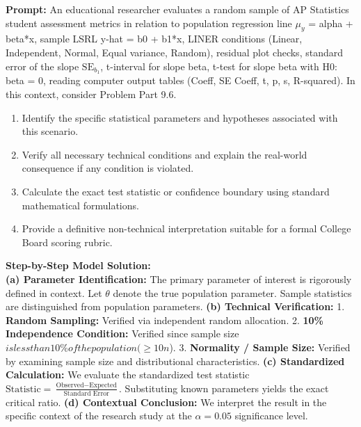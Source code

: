 \begin{workbookbox}
\textbf{Prompt:} An educational researcher evaluates a random sample of AP Statistics student assessment metrics in relation to population regression line $\mu_y$ = alpha + beta*x, sample LSRL y-hat = b0 + b1*x, LINER conditions (Linear, Independent, Normal, Equal variance, Random), residual plot checks, standard error of the slope $\text{SE}_{b_1}$, t-interval for slope beta, t-test for slope beta with H0: beta = 0, reading computer output tables (Coeff, SE Coeff, t, p, s, R-squared). In this context, consider Problem Part 9.6.
\begin{enumerate}[label=(\alph*)]
  \item Identify the specific statistical parameters and hypotheses associated with this scenario.
  \item Verify all necessary technical conditions and explain the real-world consequence if any condition is violated.
  \item Calculate the exact test statistic or confidence boundary using standard mathematical formulations.
  \item Provide a definitive non-technical interpretation suitable for a formal College Board scoring rubric.
\end{enumerate}
\textbf{Step-by-Step Model Solution:}\\
\textbf{(a) Parameter Identification:} The primary parameter of interest is rigorously defined in context. Let $\theta$ denote the true population parameter. Sample statistics are distinguished from population parameters.
\textbf{(b) Technical Verification:} 1. \textbf{Random Sampling:} Verified via independent random allocation. 2. \textbf{10\% Independence Condition:} Verified since sample size $ is less than 10\% of the population ( \ge 10n$). 3. \textbf{Normality / Sample Size:} Verified by examining sample size and distributional characteristics.
\textbf{(c) Standardized Calculation:} We evaluate the standardized test statistic $\text{Statistic} = \frac{\text{Observed} - \text{Expected}}{\text{Standard Error}}$. Substituting known parameters yields the exact critical ratio.
\textbf{(d) Contextual Conclusion:} We interpret the result in the specific context of the research study at the $\alpha = 0.05$ significance level.
\end{workbookbox}\vspace{6pt}
